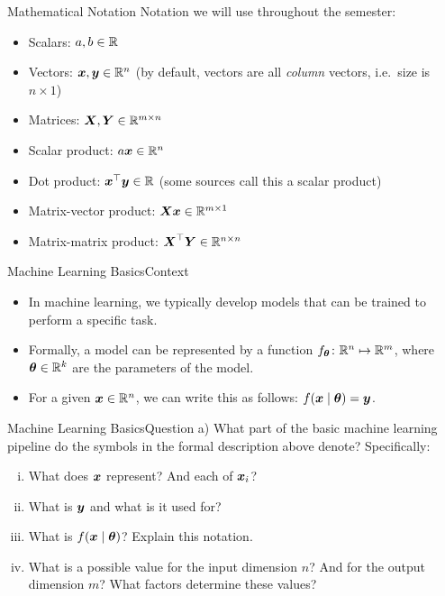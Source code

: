 \documentclass[t]{beamer}
\begin{document}
\begin{frame}{Mathematical Notation}{}
    Notation we will use throughout the semester:
    \begin{itemize}
        \item Scalars: $a,b\in\mathbb{R}$
        \item Vectors: ${\boldsymbol{x}},{\boldsymbol{y}}\in\mathbb{R}^n$ (by default, vectors are all \emph{column}
              vectors, i.e.\ size is $n\times 1$)
        \item Matrices: ${\boldsymbol{X}},{\boldsymbol{Y}}\in\mathbb{R}^{m\times n}$
        \item Scalar product: $a{\boldsymbol{x}}\in\mathbb{R}^n$
        \item Dot product: ${\boldsymbol{x}}^\top{\boldsymbol{y}}\in\mathbb{R}$ (some sources call this a scalar product)
        \item Matrix-vector product: ${\boldsymbol{X}}{\boldsymbol{x}}\in\mathbb{R}^{m\times 1}$
        \item Matrix-matrix product: ${\boldsymbol{X}}^\top{\boldsymbol{Y}}\in\mathbb{R}^{n\times n}$
    \end{itemize}
\end{frame}

\begin{frame}{Machine Learning Basics}{Context}
    \begin{itemize}
        \item In machine learning, we typically develop models that can be
              trained to perform
              a specific task.
        \item Formally, a model can be represented by a function
              $f_{{\boldsymbol{\theta}}}\colon \mathbb{R}^n\mapsto \mathbb{R}^m$, where
              ${\boldsymbol{\theta}}\in\mathbb{R}^k$ are the parameters of the model.
        \item For a given ${\boldsymbol{x}}\in\mathbb{R}^n$, we can write this as follows:
              $f({\boldsymbol{x}}\mid{\boldsymbol{\theta}}) = {\boldsymbol{y}}$.
    \end{itemize}
\end{frame}

\begin{frame}{Machine Learning Basics}{Question a)}
    What part of the basic machine learning pipeline do the symbols in the
    formal description above denote?
    Specifically:
    \begin{enumerate}[(i)]
        \item What does ${\boldsymbol{x}}$ represent? And each of ${\boldsymbol{x}}_i$?
        \item What is ${\boldsymbol{y}}$ and what is it used for?
        \item What is $f({\boldsymbol{x}}\mid{\boldsymbol{\theta}})$? Explain this notation.
        \item What is a possible value for the input dimension $n$?
              And for the output dimension $m$? What factors determine
              these values?
    \end{enumerate}
\end{frame}
\end{document}
